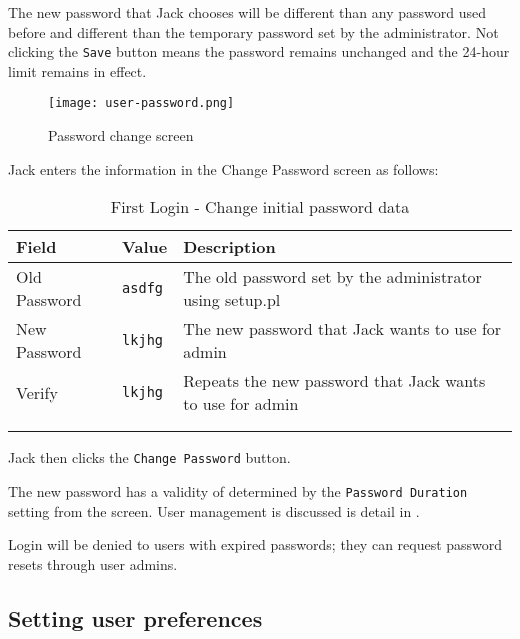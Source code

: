 The new password that Jack chooses will be different than any password used before and 
different than the temporary password set by the administrator.
Not clicking the \texttt{Save} button means the password remains unchanged and the
24-hour limit remains in effect.

\begin{figure}[H]
\centering
\texttt{[image: user-password.png]}
\caption{Password change screen}
\label{fig:first-user-password}
\end{figure}

Jack enters the information in the Change Password screen as follows:
\begin{longtable}{ llp{6cm} }
	Field & Value & Description \\ \hline
	\endhead
	Old Password & \texttt{asdfg} & The old password set by the administrator using setup.pl\\
	New Password & \texttt{lkjhg} & The new password that Jack wants to use for admin\\
	Verify & \texttt{lkjhg} &  Repeats the new password that Jack wants to use for admin\\
	\\
	\caption{First Login - Change initial password data}
	\label{fig:first-user-change-initial-password}
\end{longtable}


Jack then clicks the \texttt{Change Password} button.

The new password has a validity of determined by the \texttt{Password Duration} setting
from the  screen. User management is discussed is detail in .

Login will be denied to users with expired passwords; they can request
password resets through user admins.

\subsection{Setting user preferences}
\label{subsec-setting-user-preferences}

